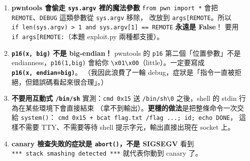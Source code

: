 \documentclass[10pt,a4paper]{article}
\providecommand{\tightlist}{%
  \setlength{\itemsep}{0pt}\setlength{\parskip}{0pt}}
\begin{document}
\begin{enumerate}
  \begin{itemize}
  \tightlist
  \item
    長度前綴與 size 欄位都是 \textbf{big-endian}。
  \item
    加密用的 \texttt{K} 索引是 \textbf{訊息內的}
    \texttt{i\ \allowbreak{}\&\allowbreak{}\ \allowbreak{}0xf}，不是絕對 offset。
    寫錯的話「第一封訊息（counter=0）」會完全正常，\textbf{之後才開始爛}，非常難查。
  \end{itemize}
\item
  \textbf{pwntools 會偷走 \texttt{sys.\allowbreak{}argv} 裡的魔法參數}
  \texttt{from\ \allowbreak{}pwn\ \allowbreak{}import\ \allowbreak{}*} 會把 \texttt{REMOTE}、\texttt{DEBUG}
  這類參數從 \texttt{sys.\allowbreak{}argv} 移除， 改放到
  \texttt{args{[}\textquotesingle{}\allowbreak{}REMOTE\textquotesingle{}\allowbreak{}{]}}。所以
  \texttt{if\ \allowbreak{}len(sys.\allowbreak{}argv)\ \allowbreak{}\textgreater{}\allowbreak{}\ \allowbreak{}1\ \allowbreak{}and\ \allowbreak{}sys.\allowbreak{}argv{[}1{]}\ \allowbreak{}==\ \allowbreak{}\textquotesingle{}\allowbreak{}REMOTE\textquotesingle{}\allowbreak{}}
  \textbf{永遠是 False}！ 要用
  \texttt{if\ \allowbreak{}args{[}\textquotesingle{}\allowbreak{}REMOTE\textquotesingle{}\allowbreak{}{]}:}（本題
  exploit.py 兩種都支援）。
\item
  \textbf{\texttt{p16(x,\allowbreak{}\ \allowbreak{}\textquotesingle{}\allowbreak{}big\textquotesingle{}\allowbreak{})} 不是
  big-endian！} pwntools 的 \texttt{p16} 第二個「位置參數」不是
  endianness，\texttt{p16(1,\allowbreak{}\textquotesingle{}\allowbreak{}big\textquotesingle{}\allowbreak{})}
  會給你
  \texttt{\textbackslash{}\allowbreak{}x01\textbackslash{}\allowbreak{}x00}（little）。一定要寫成
  \textbf{\texttt{p16(x,\allowbreak{}\ \allowbreak{}endian=\textquotesingle{}\allowbreak{}big\textquotesingle{}\allowbreak{})}}。
  （我因此浪費了一輪
  debug，症狀是「指令一直被拒絕，但錯誤碼看起來很合理」。）
\item
  \textbf{不要用互動式 \texttt{/\allowbreak{}bin/\allowbreak{}sh}} 實測：\texttt{cmd\ \allowbreak{}0x15} 送
  \texttt{/\allowbreak{}bin/\allowbreak{}sh\textbackslash{}\allowbreak{}0} 之後，shell 的 stdin
  行為在某些環境下會直接結束
  （拿不到輸出）。\textbf{更穩的做法}是把整條命令一次交給
  \texttt{system()}：
  \texttt{cmd\ \allowbreak{}0x15\ \allowbreak{}+\ \allowbreak{}b\textquotesingle{}\allowbreak{}cat\ \allowbreak{}flag.\allowbreak{}txt\ \allowbreak{}/\allowbreak{}flag\ \allowbreak{}...;\ \allowbreak{}id;\ \allowbreak{}echo\ \allowbreak{}DONE\textquotesingle{}\allowbreak{}}，
  這樣不需要 TTY、不需要等待 shell 提示字元，輸出直接出現在 socket 上。
\item
  \textbf{canary 檢查失敗的症狀是 \texttt{abort()}，不是 SIGSEGV} 看到
  \texttt{***\ \allowbreak{}stack\ \allowbreak{}smashing\ \allowbreak{}detected\ \allowbreak{}***} 就代表你動到 canary 了。
\end{enumerate}
\end{document}
